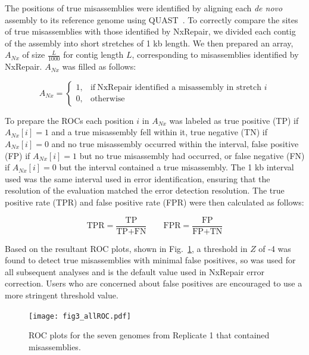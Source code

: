 \documentclass[fleqn,10pt]{wlpeerj}
\begin{document}
The positions of true misassemblies were identified by aligning each \textit{de novo} assembly to its reference genome using QUAST~\citep{gurevich2013}. To correctly compare the sites of true misassemblies with those identified by NxRepair, we divided each contig of the assembly into short stretches of 1 kb length. We then prepared an array, $A_{Nx}$ of size $\frac{L}{1000}$ for contig length $L$, corresponding to misassemblies identified by NxRepair. $A_{Nx}$ was filled as follows:

\begin{equation}
    A_{Nx}=
    \begin{cases}
      1, & \text{if}\ \text{NxRepair identified a misassembly in stretch $i$} \\
      0, & \text{otherwise}
    \end{cases}
  \label{eq:found}
\end{equation}

To prepare the ROCs each position $i$ in $A_{Nx}$ was labeled as true positive (TP) if $A_{Nx}[i] = 1$ and a true misassembly fell within it, true negative (TN) if $A_{Nx}[i] = 0$ and no true misassembly occurred within the interval, false positive (FP) if $A_{Nx}[i] = 1$ but no true misassembly had occurred, or false negative (FN) if $A_{Nx}[i] = 0$ but the interval contained a true misassembly. The 1 kb interval used was the same interval used in error identification, ensuring that the resolution of the evaluation matched the error detection resolution. The true positive rate (TPR) and false positive rate (FPR) were then calculated as follows:

\begin{equation}
\text{TPR} = \frac{\text{TP}}{\text{TP} + \text{FN}} \qquad \text{FPR} = \frac{\text{FP}}{\text{FP} + \text{TN}}
\label{eq:tpr}
\end{equation}

Based on the resultant ROC plots, shown in Fig.~\ref{fig:ROCs}, a threshold in $Z$ of -4 was found to detect true misassemblies with minimal false positives, so was used for all subsequent analyses and is the default value used in NxRepair error correction. Users who are concerned about false positives are encouraged to use a more stringent threshold value.

\begin{figure}
\centerline{\texttt{[image: fig3\_allROC.pdf]}}
\caption{ROC plots for the seven genomes from Replicate 1 that contained misassemblies.\label{fig:ROCs}}
\end{figure}
\end{document}
